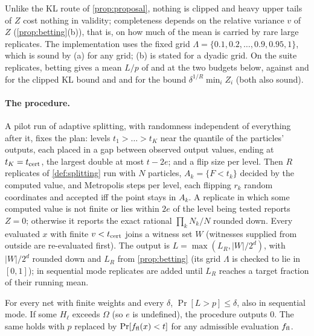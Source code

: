 Unlike the KL route of \cref{prop:proposal}, nothing is clipped and heavy upper tails
of $Z$ cost nothing in validity; completeness depends on the relative variance $v$ of
$Z$ (\cref{prop:betting}(b)), that is, on how much of the mean is carried by rare large
replicates. The
implementation uses the fixed grid $\Lambda=\{0.1,0.2,\dots,0.9,0.95,1\}$, which is
sound by (a) for any grid; (b) is stated for a dyadic grid. On the suite replicates,
betting gives a mean $L/p$ of \nnCombMBet{} and \nnCombLBet{} at the two budgets below,
against \nnCombMClip{} and \nnCombLClip{} for the clipped KL bound and \nnCombMMin{} and
\nnCombLMin{} for the bound $\delta^{1/R}\min_iZ_i$ (both also sound).

\paragraph{The procedure.} A pilot run of adaptive splitting, with randomness
independent of everything after it, fixes the plan: levels $t_1>\dots>t_K$ near the
\nnRhoPct{} quantile of the particles' outputs, each placed in a gap between observed
output values, ending at $t_K=t_{\rm cert}$, the largest double at most $t-2e$; and a
flip size per level. Then $R$ replicates of \cref{def:splitting} run with $N$
particles, $A_k=\{F<t_k\}$ decided by the computed value, and \nnMoves{} Metropolis
steps per level, each flipping $r_k$ random coordinates and accepted iff the point stays in
$A_k$. A replicate in which some computed value is not finite or lies within $2e$ of
the level being tested reports $Z=0$; otherwise it reports the exact rational
$\prod_kN_k/N$ rounded down. Every evaluated $x$ with finite $v<t_{\rm cert}$ joins a
witness set $W$ (witnesses supplied from outside are re-evaluated first). The output
is $L=\max(L_R,|W|/2^d)$, with $|W|/2^d$ rounded down and $L_R$ from
\cref{prop:betting} (its grid $\Lambda$ is checked to lie in $[0,1]$); in sequential mode replicates are added until $L_R$ reaches a
target fraction of their running mean.

\begin{corollary}\label{cor:nets-lower}
For every net with finite weights and every $\delta$, $\Pr[L>p]\le\delta$, also in
sequential mode. If some $H_\ell$ exceeds $\Omega$ (so $e$ is undefined), the procedure
outputs $0$. The same holds with $p$ replaced by $\Pr[f_{\rm fl}(x)<t]$ for any
admissible evaluation $f_{\rm fl}$.
\end{corollary}

